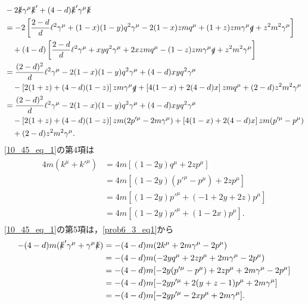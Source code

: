 \begin{align}
  \begin{split}
    & -2 \slashed{k} \gamma^\mu \slashed{k}' + (4-d) \slashed{k}' \gamma^\mu \slashed{k} \\
    &= -2 \left[ \frac{2-d}{d} \ell^2 \gamma^\mu + (1-x)(1-y) q^2 \gamma^\mu
    - 2 (1-x)z m q^\mu + (1+z)z m \gamma^\mu \slashed{q} + z^2m^2 \gamma^\mu \right] \\
    & \quad + (4-d) \left[ \frac{2-d}{d} \ell^2 \gamma^\mu + xy q^2 \gamma^\mu
    + 2xzm q^\mu - (1-z)zm \gamma^\mu \slashed{q} + z^2m^2 \gamma^\mu \right] \\
    &= \frac{(2-d)^2}{d} \ell^2 \gamma^\mu - 2 (1-x)(1-y) q^2 \gamma^\mu
    + (4-d) xy q^2 \gamma^\mu \\
    & \quad - \left[ 2(1+z) + (4-d)(1-z) \right] zm \gamma^\mu \slashed{q}
    + \left[ 4(1-x) + 2(4-d)x \right] zm q^\mu + (2-d) z^2m^2\gamma^\mu \\
    &= \frac{(2-d)^2}{d} \ell^2 \gamma^\mu - 2 (1-x)(1-y) q^2 \gamma^\mu
    + (4-d) xy q^2 \gamma^\mu \\
    & \quad - \left[ 2(1+z) + (4-d)(1-z) \right] zm (2p'^\mu  - 2m\gamma^\mu)
    + \left[ 4(1-x) + 2(4-d)x \right] zm (p'^\mu - p^\mu) \\
    & \quad + (2-d) z^2m^2\gamma^\mu . \\
  \end{split}
  \label{10_45_eq_1_term1_2}
\end{align}
\eqref{10_45_eq_1}の第4項は
\begin{align}
  \begin{split}
    4m (k^\mu + k'^\mu) &= 4m \left[ (1-2y)q^\mu + 2zp^\mu \right] \\
    &= 4m \left[ (1-2y)(p'^\mu - p^\mu) + 2zp^\mu \right] \\
    &= 4m \left[ (1-2y) p'^\mu + (-1 + 2y + 2z) p^\mu \right] \\
    &= 4m \left[ (1-2y) p'^\mu + (1 - 2x) p^\mu \right] .
  \end{split}
  \label{10_45_eq_1_term4}
\end{align}
\eqref{10_45_eq_1}の第5項は，\eqref{prob6_3_eq1}から
\begin{align}
  \begin{split}
    - (4-d) m (\slashed{k}' \gamma^\mu + \gamma^\mu \slashed{k})
    &= - (4-d) m (2k^\mu + 2m \gamma^\mu - 2p^\mu) \\
    &= - (4-d) m (-2yq^\mu + 2zp^\mu + 2m\gamma^\mu - 2p^\mu) \\
    &= - (4-d) m [ -2y(p'^\mu - p^\mu) + 2zp^\mu + 2m\gamma^\mu - 2p^\mu ] \\
    &= - (4-d) m [ -2yp'^\mu + 2(y+z-1) p^\mu + 2m\gamma^\mu ] \\
    &= - (4-d) m [ -2yp'^\mu - 2x p^\mu + 2m\gamma^\mu ] .
  \end{split}
  \label{10_45_eq_1_term5}
\end{align}
